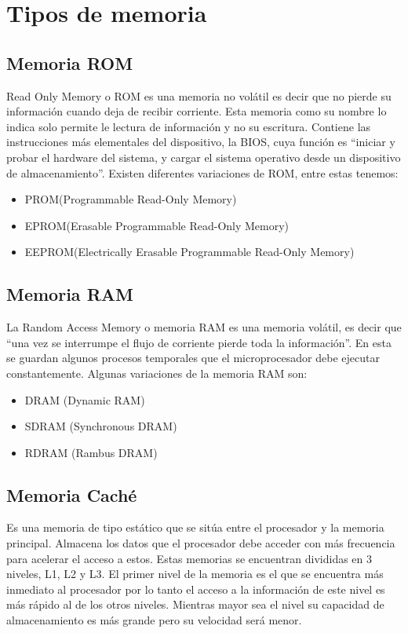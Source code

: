 \documentclass{article}
\begin{document}
\section{Tipos de memoria}

\subsection{Memoria ROM} 
Read Only Memory o ROM es una memoria no volátil es decir que no pierde su información cuando deja de recibir corriente. Esta memoria como su nombre lo indica solo permite le lectura de información y no su escritura. Contiene las instrucciones más elementales del dispositivo, la BIOS, cuya función es ``iniciar y probar el hardware del sistema, y cargar el sistema operativo desde un dispositivo de almacenamiento''\cite{romram}. Existen diferentes variaciones de ROM, entre estas tenemos:

\begin{itemize}
    \item{PROM(Programmable Read-Only Memory)}
    \item{EPROM(Erasable Programmable Read-Only Memory)}
    \item{EEPROM(Electrically Erasable Programmable Read-Only Memory)}
\end{itemize}

\subsection{Memoria RAM}
La Random Access Memory o memoria RAM es una memoria volátil, es decir que ``una vez se interrumpe el flujo de corriente pierde toda la información''\cite{romram}. En esta se guardan algunos procesos temporales que el microprocesador debe ejecutar constantemente. Algunas variaciones de la memoria RAM son:
\begin{itemize}
    \item{DRAM (Dynamic RAM)}
    \item{SDRAM (Synchronous DRAM)}
    \item{RDRAM (Rambus DRAM)}
\end{itemize}

\subsection{Memoria Caché} 
Es una memoria de tipo estático que se sitúa entre el procesador y la memoria principal. Almacena los datos que el procesador debe acceder con más frecuencia para acelerar el acceso a estos. Estas memorias se encuentran divididas en 3 niveles, L1, L2 y L3. El primer nivel de la memoria es el que se encuentra más inmediato al procesador por lo tanto el acceso a la información de este nivel es más rápido al de los otros niveles. Mientras mayor sea el nivel su capacidad de almacenamiento es más grande pero su velocidad será menor.
\end{document}
